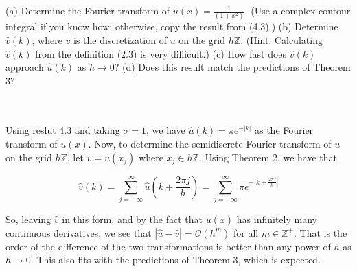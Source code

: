 (a) Determine the Fourier transform of $u(x)=\frac{1}{(1 + x^2 )}$. (Use a complex contour integral
if you know how; otherwise, copy the result from (4.3).) (b) Determine $\hat{v}(k)$, where $v$ is the
discretization of $u$ on the grid $h\mathbb{Z}$. (Hint. Calculating $\hat{v}(k)$ from the definition
(2.3) is very difficult.) (c) How fast does $\hat{v}(k)$ approach $\hat{u}(k)$ as $h\rightarrow0$? (d)
Does this result match the predictions of Theorem 3?\\\\

\begin{solution}\renewcommand{\qedsymbol}{}\ \\
    Using reslut 4.3 and taking $\sigma=1$, we have $\hat{u}(k)=\pi e^{-|k|}$ as the Fourier transform
    of $u(x)$. Now, to determine the semidiscrete Fourier transform of $u$ on the grid $h\mathbb{Z}$,
    let $v=u(x_j)$ where $x_j\in h\mathbb{Z}$. Using Theorem 2, we have that
    
    $$\hat{v}(k)=\sum_{j=-\infty}^{\infty}\hat{u}(k+\frac{2\pi j}{h})=
    \sum_{j=-\infty}^{\infty}\pi e^{-|k+\frac{2\pi j}{h}|}$$

    So, leaving $\hat{v}$ in this form, and by the fact that $u(x)$ has infinitely many continuous
    derivatives, we see that $|\hat{u}-\hat{v}|=\mathcal{O}(h^m)$ for all $m\in\mathbb{Z}^+$. That is
    the order of the difference of the two transformations is better than any power of $h$ as
    $h\rightarrow 0$. This also fits with the predictions of Theorem 3, which is expected.

\end{solution}